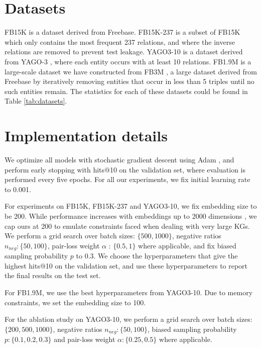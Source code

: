 \documentclass[11pt,a4paper, dvipsnames]{article}
\begin{document}
\section{Datasets} \label{sec:Datasets}
 FB15K \citep{Bordes2013TranslatingData} is a dataset derived from Freebase. FB15K-237 \citep{Toutanova2015RepresentingBases} is a subset of FB15K which only contains the most frequent 237 relations, and where the inverse relations are removed to prevent test leakage.  YAGO3-10 \citep{Dettmers2018ConvolutionalEmbeddings} is a dataset derived from YAGO-3 \citep{Suchanek2007Yago}, where each entity occurs with at least 10 relations. FB1.9M is a large-scale dataset we have constructed from FB3M \citep{Xu2018InvestigationsExtraction}, a large dataset derived from Freebase by iteratively removing entities that occur in less than 5
triples until no such entities remain. The statistics for each of these datasets could be found in Table \ref{tab:datasets}.

\section{Implementation details}\label{sec:implementation}
We optimize all models with stochastic gradient descent using Adam \citep{Kingma2014Adam:Optimization}, and perform early stopping with hits@10 on the validation set, where evaluation is performed every five epochs. For all our experiments, we fix initial learning rate to 0.001.

For experiments on FB15K, FB15K-237 and YAGO3-10, we fix embedding size to be 200. While performance increases with embeddings up to 2000 dimensions \cite{Kadlec2017KnowledgeBack, Lacroix2018CanonicalCompletion}, we cap ours at 200 to emulate constraints faced when dealing with very large KGs.  We perform a grid search over batch sizes: $\{500, 1000\}$, negative ratios $ n_{neg}: \{50, 100\}$, pair-loss weight $\alpha$ : $\{0.5, 1\}$  where applicable, and fix biased sampling probability $p$ to $0.3$. We choose the hyperparameters that give the highest hits@10 on the validation set, and use these hyperparameters to report the final results on the test set. 




For FB1.9M, we use the best hyperparameters from YAGO3-10. Due to memory constraints, we set the embedding size to 100. 

For the ablation study on YAGO3-10, we perform a grid search over batch sizes: $\{200, 500, 1000\}$, negative ratios $ n_{neg}: \{50, 100\}$, biased sampling probability $p: \{0.1, 0.2, 0.3\}$ and pair-loss weight $\alpha: \{0.25, 0.5\}$ where applicable. 
\end{document}
